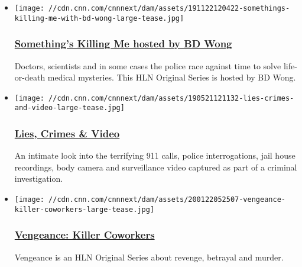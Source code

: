 \begin{itemize}
\item
  \href{https://cnncreativemarketing.com/project/skm/}{}

  \texttt{[image: //cdn.cnn.com/cnnnext/dam/assets/191122120422-somethings-killing-me-with-bd-wong-large-tease.jpg]}

  \hypertarget{somethings-killing-me-hosted-by-bd-wong}{%
  \subsubsection{\texorpdfstring{\href{https://cnncreativemarketing.com/project/skm/}{Something's
  Killing Me hosted by BD
  Wong}}{Something's Killing Me hosted by BD Wong}}\label{somethings-killing-me-hosted-by-bd-wong}}

  Doctors, scientists and in some cases the police race against time to
  solve life-or-death medical mysteries. This HLN Original Series is
  hosted by BD Wong.
\end{itemize}

\begin{itemize}
\item
  \href{https://www.instagram.com/p/Bxkzr6RBVhA/}{}

  \texttt{[image: //cdn.cnn.com/cnnnext/dam/assets/190521121132-lies-crimes-and-video-large-tease.jpg]}

  \hypertarget{lies-crimes--video}{%
  \subsubsection{\texorpdfstring{\href{https://www.instagram.com/p/Bxkzr6RBVhA/}{Lies,
  Crimes \& Video}}{Lies, Crimes \& Video}}\label{lies-crimes--video}}

  An intimate look into the terrifying 911 calls, police interrogations,
  jail house recordings, body camera and surveillance video captured as
  part of a criminal investigation.
\end{itemize}

\begin{itemize}
\item
  \href{https://www.facebook.com/watch/?v=1434212813412479}{}

  \texttt{[image: //cdn.cnn.com/cnnnext/dam/assets/200122052507-vengeance-killer-coworkers-large-tease.jpg]}

  \hypertarget{vengeance-killer-coworkers}{%
  \subsubsection{\texorpdfstring{\href{https://www.facebook.com/watch/?v=1434212813412479}{Vengeance:
  Killer
  Coworkers}}{Vengeance: Killer Coworkers}}\label{vengeance-killer-coworkers}}

  Vengeance is an HLN Original Series about revenge, betrayal and
  murder.
\end{itemize}

